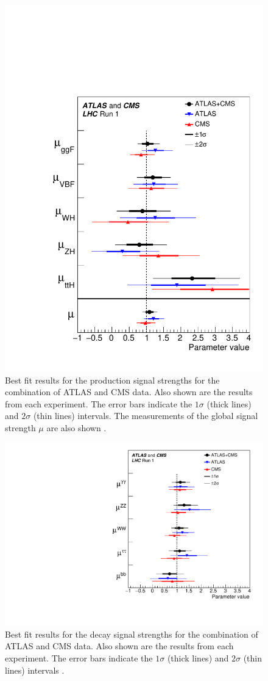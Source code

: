 \begin{figure}[!htbp]
  \begin{center}
    \includegraphics[width=0.5\linewidth]{figures/higgs/higgs_decay_measurement_1.pdf}
    \caption{Best fit results for the production signal strengths for the combination of ATLAS and CMS data. Also shown are the results from each experiment. The error bars indicate the $1\sigma$ (thick lines) and $2\sigma$ (thin lines) intervals. The measurements of the global signal strength $\mu$ are also shown \cite{Khachatryan:2016vau}.}
    \label{fig:higgs_decay_measurement_1}
  \end{center}
\end{figure}

\begin{figure}[!htbp]
  \begin{center}
    \includegraphics[width=0.5\linewidth]{figures/higgs/higgs_decay_measurement_2.pdf}
    \caption{ Best fit results for the decay signal strengths for the combination of ATLAS and CMS data. Also shown are the results from each experiment. The error bars indicate the $1\sigma$ (thick lines) and $2\sigma$ (thin lines) intervals \cite{Khachatryan:2016vau}.}
    \label{fig:higgs_decay_measurement_2}
  \end{center}
\end{figure}
